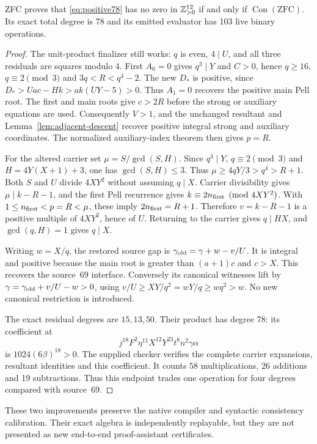 \begin{prop}
ZFC proves that \eqref{eq:positive78} has no zero in $\mathbb Z_{>0}^{12}$ if and
only if $\operatorname{Con}(\mathrm{ZFC})$. Its exact total degree is 78
and its emitted evaluator has 103 live binary operations.
\end{prop}
\begin{proof}
The unit-product finalizer still works: $q$ is even, $4\mid U$, and all
three residuals are squares modulo 4. First $A_0=0$ gives $q^3\mid Y$
and $C>0$, hence $q\ge16$, $q\equiv2\pmod3$ and
$3q<R<q^4-2$. The new $D_*$ is positive, since
$D_*>Uac-Hk>ak(UY-5)>0$. Thus $A_1=0$ recovers the positive main
Pell root. The first and main roots give $c>2R$ before the strong or
auxiliary equations are used. Consequently $V>1$, and the unchanged
resultant and Lemma~\ref{lem:adjacent-descent} recover positive integral
strong and auxiliary coordinates. The normalized auxiliary-index theorem
then gives $p=R$.

For the altered carrier set $\mu=S/\gcd(S,H)$. Since $q^3\mid Y$,
$q\equiv2\pmod3$ and $H=4Y(X+1)+3$, one has $\gcd(S,H)\le3$.
Thus $\mu\ge4qY/3>q^4>R+1$. Both $S$ and $U$ divide $4XY^2$
without assuming $q\mid X$. Carrier divisibility gives
$\mu\mid k-R-1$, and the first Pell recurrence gives
$k\equiv2n_{\rm first}\pmod{4XY^2}$. With
$1\le n_{\rm first}<p=R<\mu$, these imply
$2n_{\rm first}=R+1$. Therefore $v=k-R-1$ is a positive multiple of
$4XY^2$, hence of $U$. Returning to the carrier gives $q\mid HX$,
and $\gcd(q,H)=1$ gives $q\mid X$.

Writing $w=X/q$, the restored source gap is
$\gamma_{\rm old}=\gamma+w-v/U$. It is integral and positive because
the main root is greater than $(a+1)c$ and $c>X$.
This recovers the source~69 interface. Conversely its canonical witnesses
lift by $\gamma=\gamma_{\rm old}+v/U-w>0$, using
$v/U\ge XY/q^2=wY/q\ge wq^2>w$. No new canonical restriction is
introduced.

The exact residual degrees are $15,13,50$. Their product has degree 78:
its coefficient at
\[
 j^{18}F^2\eta^{11}X^{12}Y^{23}t^8n^2\gamma\alpha
\]
is $1024(6\beta)^{18}>0$. The supplied checker verifies the complete
carrier expansions, resultant identities and this coefficient. It counts
58 multiplications, 26 additions and 19 subtractions. Thus this endpoint
trades one operation for four degrees compared with source~69.
\end{proof}

These two improvements preserve the native compiler and syntactic
consistency calibration. Their exact algebra is independently replayable,
but they are not presented as new end-to-end proof-assistant certificates.
